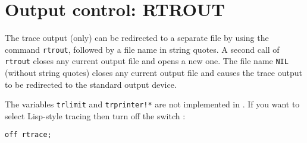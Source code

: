 \section{Output control: RTROUT}

\hypertarget{command:RTROUT}{}
The trace output (only) can be redirected to a separate file by using
the command \texttt{rtrout}, followed by a file name in string quotes.
A second call of \texttt{rtrout} closes any current output file and
opens a new one.  The file name \texttt{NIL} (without string quotes)
closes any current output file and causes the trace output to be
redirected to the standard output device.

The \rdebug{} variables \texttt{trlimit} and \texttt{trprinter!*} are
not implemented in \rtrace{}.  If you want to select Lisp-style
tracing then turn off the switch \rtrace{}:
\begin{verbatim}
off rtrace;
\end{verbatim}

\endinput
after loading the \rtrace{} package.  Note that the \rtrace{} switch
controls the display format of both procedure and rule tracing.


